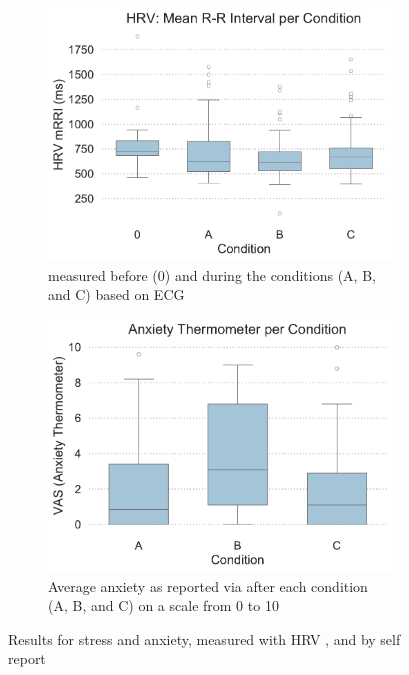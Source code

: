 \begin{figure}[htb]
	\centering
	\begin{subfigure}[t]{0.49\columnwidth}
		\centering
		\includegraphics[width=\textwidth]{include/images/hrv_per_condition.pdf}
		\caption{ measured before (0) and during the conditions (A, B, and C) based on \gls{ECG}}
		\label{fig:stress-hrv}
	\end{subfigure}
	\hspace*{\fill}
	\begin{subfigure}[t]{0.49\columnwidth}
		\centering
		\includegraphics[width=\textwidth]{include/images/at_per_condition.pdf}
		\caption{Average anxiety as reported via  after each condition (A, B, and C) on a scale from 0 to 10}
		\label{fig:anxiety-at}
	\end{subfigure}
	\captionsetup{subrefformat=parens}
	\caption[Results: stress and anxiety]{Results for stress and anxiety, measured with \gls{HRV} , and by self report }
	\label{fig:stress-anxiety}
\end{figure}
